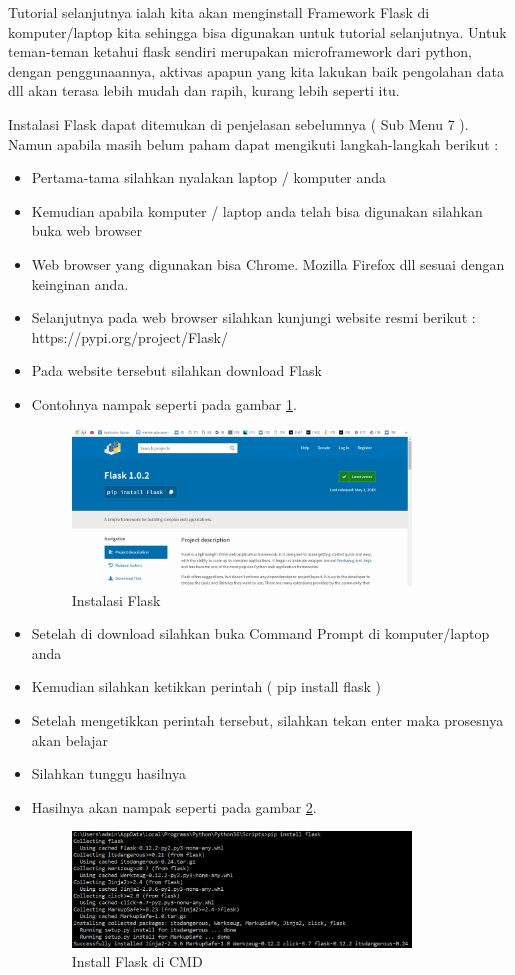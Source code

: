 \begin{enumerate}
Tutorial selanjutnya ialah kita akan menginstall Framework Flask di komputer/laptop kita sehingga bisa digunakan untuk tutorial selanjutnya. Untuk teman-teman ketahui flask sendiri merupakan microframework dari python, dengan penggunaannya, aktivas apapun yang kita lakukan baik pengolahan data dll akan terasa lebih mudah dan rapih, kurang lebih seperti itu.

Instalasi Flask dapat ditemukan di penjelasan sebelumnya ( Sub Menu 7 ). Namun apabila masih belum paham dapat mengikuti langkah-langkah berikut :
\begin{itemize}
\item Pertama-tama silahkan nyalakan laptop / komputer anda
\item Kemudian apabila komputer / laptop anda telah bisa digunakan silahkan buka web browser 
\item Web browser yang digunakan bisa Chrome. Mozilla Firefox dll sesuai dengan keinginan anda.
\item Selanjutnya pada web browser silahkan kunjungi website resmi berikut : https://pypi.org/project/Flask/
\item Pada website tersebut silahkan download Flask
\item Contohnya nampak seperti pada gambar \ref{fig:insfla}.
\begin{figure}[!htbp]
	\centerline{\includegraphics[width=0.85\textwidth]{figures/10/insfla.PNG}}
	\caption{Instalasi Flask}
	\label{fig:insfla}
\end{figure}

\item Setelah di download silahkan buka Command Prompt di komputer/laptop anda
\item Kemudian silahkan ketikkan perintah ( pip install flask )
\item Setelah mengetikkan perintah tersebut, silahkan tekan enter maka prosesnya akan belajar
\item Silahkan tunggu hasilnya
\item Hasilnya akan nampak seperti pada gambar \ref{fig:ifc}.
\begin{figure}[!htbp]
	\centerline{\includegraphics[width=0.85\textwidth]{figures/10/ifc.PNG}}
	\caption{Install Flask di CMD}
	\label{fig:ifc}
\end{figure}


\end{itemize}
\end{enumerate}

